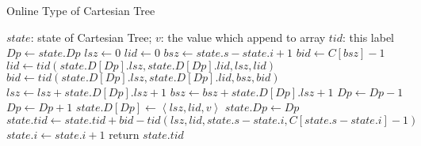 \begin{algorithm*}[!thb]
  \caption{Online Type of Cartesian Tree}
  \label{alg:cartesian-encode-online}
  \begin{algorithmic}[1]
  \Require
      $\mathit{state}$: state of Cartesian Tree;
      $v$: the value which append to array
  \Ensure
      $\mathit{tid}$: this label
  \State $\textit{Dp} \gets \textit{state}.\textit{Dp}$
  \State $\textit{lsz} \gets 0$ 
  \State $\textit{lid} \gets 0$
  \State $\textit{bsz} \gets \textit{state}.\textit{s} - \textit{state}.\textit{i} + 1$
  \State $\textit{bid} \gets C[\textit{bsz}] - 1$
    \State $\textit{lid} \gets \textit{tid}(\textit{state}.D[\textit{Dp}].\textit{lsz}, \textit{state}.D[\textit{Dp}].\textit{lid}, \textit{lsz}, \textit{lid})$
    \State $\textit{bid} \gets \textit{tid}(\textit{state}.D[\textit{Dp}].\textit{lsz}, \textit{state}.D[\textit{Dp}].\textit{lid}, \textit{bsz}, \textit{bid})$
    \State $\textit{lsz} \gets \textit{lsz} + \textit{state}.D[\textit{Dp}].\textit{lsz}+1$
    \State $\textit{bsz} \gets \textit{bsz} + \textit{state}.D[\textit{Dp}].\textit{lsz}+1$
    \State $\textit{Dp} \gets \textit{Dp} - 1$
  \EndWhile
  \State $\textit{Dp} \gets \textit{Dp} + 1$
  \State $\textit{state}.D[\textit{Dp}] \gets \left \langle \textit{lsz}, \textit{lid}, \textit{v} \right \rangle$
  \State $\textit{state}.\textit{Dp} \gets \textit{Dp}$
  \State $\textit{state}.\textit{tid} \gets \textit{state}.\textit{tid} + \textit{bid} - \textit{tid}(\textit{lsz}, \textit{lid}, \textit{state}.s-\textit{state}.i, C[\textit{state}.s-\textit{state}.i]-1)$
  \State $\textit{state}.i \gets \textit{state}.i + 1$
  \State return $\textit{state}.\textit{tid}$
  \end{algorithmic}
\end{algorithm*}